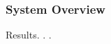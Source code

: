\documentclass{beamer}
\begin{document}
\begin{frame}
\frametitle{System Overview}
Results. . .

\end{frame}


% 
% 
\end{document}
